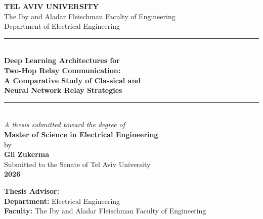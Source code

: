 \begin{titlepage}
\begin{center}
\vspace*{0.5cm}

{\LARGE\textbf{TEL AVIV UNIVERSITY}}\\[6pt]
{\large The Iby and Aladar Fleischman Faculty of Engineering}\\[4pt]
{\large Department of Electrical Engineering}\\[1.5cm]

\noindent\rule{\textwidth}{2pt}\\[0.4cm]
{\LARGE\bfseries\color{tauBlue}
Deep Learning Architectures for\\[6pt]
Two-Hop Relay Communication:\\[6pt]
A Comparative Study of Classical and\\[6pt]
Neural Network Relay Strategies}\\[0.4cm]
\noindent\rule{\textwidth}{2pt}\\[1.2cm]

{\large\textit{A thesis submitted toward the degree of}}\\[4pt]
{\large\textbf{Master of Science in Electrical Engineering}}\\[1.5cm]

{\large by}\\[6pt]
{\Large\bfseries Gil Zukerma}\\[1.5cm]

{\large Submitted to the Senate of Tel Aviv University}\\[4pt]
{\large\textbf{2026}}\\[1.5cm]

\vfill
\begin{flushleft}
\textbf{Thesis Advisor:} \\[4pt]
\textbf{Department:} \quad Electrical Engineering\\[4pt]
\textbf{Faculty:} \quad The Iby and Aladar Fleischman Faculty of Engineering
\end{flushleft}
\end{center}
\end{titlepage}